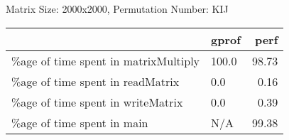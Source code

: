 \documentclass{article}
\begin{document}
    Matrix Size: 2000x2000, Permutation Number: KIJ \\
    \begin{tabular}{llr}
\hline
                                      & gprof   &   perf \\
\hline
 \%age of time spent in matrixMultiply & 100.0   &  98.73 \\
 \%age of time spent in readMatrix     & 0.0     &   0.16 \\
 \%age of time spent in writeMatrix    & 0.0     &   0.39 \\
 \%age of time spent in main           & N/A     &  99.38 \\
\hline
\end{tabular}
    
\end{document}

